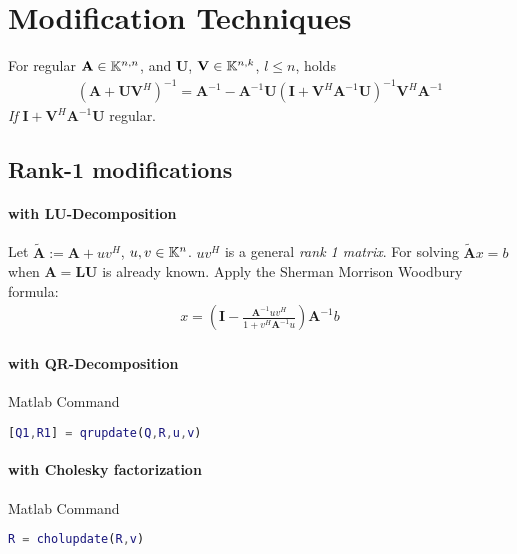 \section{Modification Techniques}
		\begin{lemma}
			For regular $\mathbf A \in \mathbb{K}^{n,n}$, and $\mathbf U$, $\mathbf V \in \mathbb{K}^{n,k}$, $l \leq n$, holds
			\begin{align*}
				(\mathbf A+\mathbf{UV}^H)^{-1} = \mathbf A^{-1} - \mathbf A^{-1}\mathbf U(\mathbf I + \mathbf V^H \mathbf A^{-1}\mathbf U)^{-1}\mathbf V^H \mathbf A^{-1}
			\end{align*}
			\emph{If} $\mathbf I + \mathbf V^H \mathbf A^{-1}\mathbf U$ regular.
		\end{lemma}
	\subsection{Rank-1 modifications}
		\paragraph{with LU-Decomposition}
			Let $\tilde{\mathbf A } :=  \mathbf A + uv^H$, $u,v \in \mathbb{K}^n$. $uv^H$ is a general \emph{rank 1 matrix}.
			For solving $\tilde{\mathbf A } x = b$ when $\mathbf{A = LU}$ is already known. Apply the Sherman Morrison Woodbury formula:
			\begin{align*}
				x = \left( \mathbf I - \frac{\mathbf A^{-1} uv^H}{1+v^H \mathbf A^{-1}u}\right)\mathbf A^{-1}b
			\end{align*}
		\paragraph{with QR-Decomposition}
			Matlab Command
			\begin{lstlisting}[language=matlab]
				[Q1,R1] = qrupdate(Q,R,u,v)
			\end{lstlisting}
		\paragraph{with Cholesky factorization}
			Matlab Command
			\begin{lstlisting}[language=matlab]
				R = cholupdate(R,v)
			\end{lstlisting}
		

